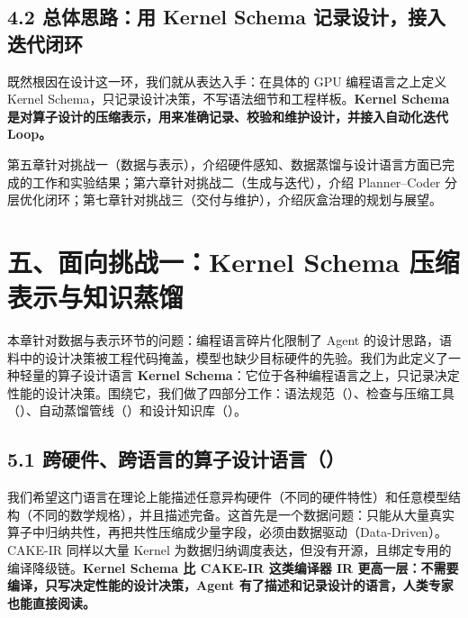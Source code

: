\subsection{4.2 总体思路：用 Kernel Schema 记录设计，接入迭代闭环}
既然根因在设计这一环，我们就从表达入手：在具体的 GPU 编程语言之上定义 Kernel Schema，只记录设计决策，不写语法细节和工程样板。\textbf{Kernel Schema 是对算子设计的压缩表示，用来准确记录、校验和维护设计，并接入自动化迭代 Loop。}


\begin{DiagramBlock}
\end{DiagramBlock}
第五章针对挑战一（数据与表示），介绍硬件感知、数据蒸馏与设计语言方面已完成的工作和实验结果；第六章针对挑战二（生成与迭代），介绍 Planner–Coder 分层优化闭环；第七章针对挑战三（交付与维护），介绍灰盒治理的规划与展望。


\SourceSeparator
\clearpage
\section{五、面向挑战一：Kernel Schema 压缩表示与知识蒸馏}
本章针对数据与表示环节的问题：编程语言碎片化限制了 Agent 的设计思路，语料中的设计决策被工程代码掩盖，模型也缺少目标硬件的先验。我们为此定义了一种轻量的算子设计语言 \textbf{Kernel Schema}：它位于各种编程语言之上，只记录决定性能的设计决策。围绕它，我们做了四部分工作：语法规范（）、检查与压缩工具（）、自动蒸馏管线（）和设计知识库（）。


\begin{DiagramBlock}
\end{DiagramBlock}
\SourceSeparator
\subsection{5.1 跨硬件、跨语言的算子设计语言（）}
我们希望这门语言在理论上能描述任意异构硬件（不同的硬件特性）和任意模型结构（不同的数学规格），并且描述完备。这首先是一个数据问题：只能从大量真实算子中归纳共性，再把共性压缩成少量字段，必须由数据驱动（Data-Driven）。CAKE-IR 同样以大量 Kernel 为数据归纳调度表达，但没有开源，且绑定专用的编译降级链。\textbf{Kernel Schema 比 CAKE-IR 这类编译器 IR 更高一层：不需要编译，只写决定性能的设计决策，Agent 有了描述和记录设计的语言，人类专家也能直接阅读。}


